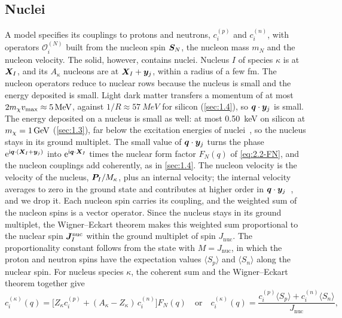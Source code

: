 \subsection{Nuclei}\label{sec:8.1-nuclei}

A model specifies its couplings to protons and neutrons, $c_i^{(p)}$ and $c_i^{(n)}$, with operators $\mathcal{O}_i^{(N)}$ built from the nucleon spin $\bm{S}_N$, the nucleon mass $m_N$ and the nucleon velocity. The solid, however, contains nuclei. Nucleus $I$ of species $\kappa$ is at $\bm{X}_I$, and its $A_\kappa$ nucleons are at $\bm{X}_I + \bm{y}_j$, within a radius of a few fm. The nucleon operators reduce to nuclear rows because the nucleus is small and the energy deposited is small. Light dark matter transfers a momentum of at most $2m_{\chi} v_{\mathrm{max}} \approx \SI{5}{MeV}$, against $1/R \approx \SI{57}{MeV}$ for silicon (\cref{sec:1.4}), so $\bm{q}\cdot\bm{y}_j$ is small. The energy deposited on a nucleus is small as well: at most \SI{0.50}{keV} on silicon at $m_{\chi} = \SI{1}{GeV}$ (\cref{sec:1.3}), far below the excitation energies of nuclei~\cite[Sect.~2.2]{fitzpatrick2013effective}, so the nucleus stays in its ground multiplet.
The small value of $\bm{q}\cdot\bm{y}_j$ turns the phase $\mathrm{e}^{\mathrm{i}\bm{q}\cdot(\bm{X}_I + \bm{y}_j)}$ into $\mathrm{e}^{\mathrm{i}\bm{q}\cdot\bm{X}_I}$ times the nuclear form factor $F_N(q)$ of \cref{eq:2.2-FN}, and the nucleon couplings add coherently, as in \cref{sec:1.4}. The nucleon velocity is the velocity of the nucleus, $\bm{P}_I/M_\kappa$, plus an internal velocity; the internal velocity averages to zero in the ground state and contributes at higher order in $\bm{q}\cdot\bm{y}_j$~\cite[Eqs.~(26) and (27)]{fitzpatrick2013effective}, and we drop it. Each nucleon spin carries its coupling, and the weighted sum of the nucleon spins is a vector operator. Since the nucleus stays in its ground multiplet, the Wigner--Eckart theorem makes this weighted sum proportional to the nuclear spin $\bm{J}^{\mathrm{nuc}}_I$ within the ground multiplet of spin $J_{\mathrm{nuc}}$. The proportionality constant follows from the state with $M = J_{\mathrm{nuc}}$, in which the proton and neutron spins have the expectation values $\langle S_p\rangle$ and $\langle S_n\rangle$ along the nuclear spin.
For nucleus species $\kappa$, the coherent sum and the Wigner--Eckart theorem together give
\begin{equation}
  c_i^{(\kappa)}(q) = \bigl[Z_\kappa c_i^{(p)} + (A_\kappa - Z_\kappa)\,c_i^{(n)}\bigr]F_N(q)
  \quad\text{or}\quad
  c_i^{(\kappa)}(q) = \frac{c_i^{(p)}\langle S_p\rangle + c_i^{(n)}\langle S_n\rangle}{J_{\mathrm{nuc}}} ,
  \label{eq:8.1-nuclear}
\end{equation}
